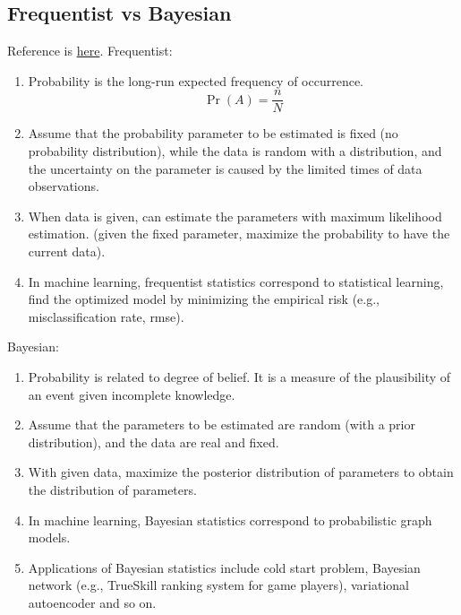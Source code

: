 \documentclass[12pt,oneside,a4paper]{article}
\numberwithin{equation}{section}
\begin{document}
\subsection{Frequentist vs Bayesian}
Reference is \href{http://www.statisticalengineering.com/frequentists_and_bayesians.htm}{here}.
Frequentist:
\begin{enumerate}
\item Probability is the long-run expected frequency of occurrence. 
\begin{equation}
\Pr (A) = \frac{n}{N}
\end{equation}

\item Assume that the probability parameter to be estimated is fixed (no probability distribution), while the data is random with a distribution, and the uncertainty on the parameter is caused by the limited times of data observations.

\item When data is given, can estimate the parameters with maximum likelihood estimation. (given the fixed parameter, maximize the probability to have the current data).

\item In machine learning, frequentist statistics correspond to statistical learning, find the optimized model by minimizing the empirical risk (e.g., misclassification rate, rmse).
\end{enumerate}

Bayesian:
\begin{enumerate}
\item Probability is related to degree of belief.  It is a measure of the plausibility of an event given incomplete knowledge.

\item Assume that the parameters to be estimated are random (with a prior distribution), and the data are real and fixed.

\item With given data, maximize the posterior distribution of parameters to obtain the distribution of parameters. 

\item In machine learning, Bayesian statistics correspond to probabilistic graph models. 
\item Applications of Bayesian statistics include cold start problem, Bayesian network (e.g., TrueSkill ranking system for game players), variational autoencoder and so on.
\end{enumerate}
\end{document}
